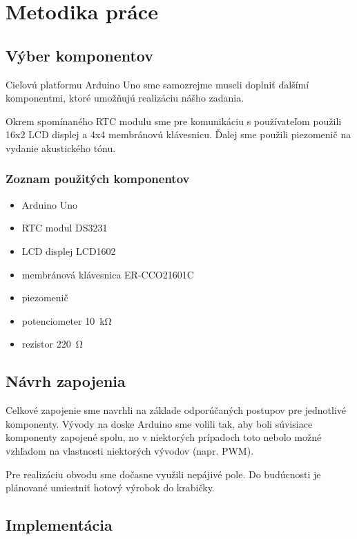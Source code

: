 \chapter{Metodika práce}

\section{Výber komponentov}
Cieľovú platformu Arduino Uno sme samozrejme museli doplniť ďalšímí komponentmi, ktoré umožňujú realizáciu nášho zadania.

Okrem spomínaného RTC modulu sme pre komunikáciu s používateľom použili 16x2 LCD displej a 4x4 membránovú klávesnicu. Ďalej sme použili piezomenič na vydanie akustického tónu.

\subsection{Zoznam použitých komponentov}
\begin{itemize}
    \item Arduino Uno
    \item RTC modul DS3231
    \item LCD displej LCD1602
    \item membránová klávesnica ER-CCO21601C
    \item piezomenič
    \item potenciometer \SI{10}{\kilo\ohm}
    \item rezistor \SI{220}{\ohm}
\end{itemize}

\section{Návrh zapojenia}
Celkové zapojenie sme navrhli na základe odporúčaných postupov pre jednotlivé komponenty. Vývody na doske Arduino sme volili tak, aby boli súvisiace komponenty zapojené spolu, no v niektorých prípadoch toto nebolo možné vzhľadom na vlastnosti niektorých vývodov (napr. PWM).

Pre realizáciu obvodu sme dočasne využili nepájivé pole. Do budúcnosti je plánované umiestniť hotový výrobok do krabičky.

\section{Implementácia}
